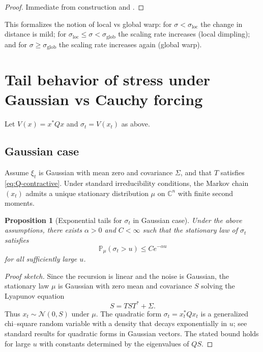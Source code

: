\documentclass[11pt]{article}
\theoremstyle{plain}
\newtheorem{proposition}[theorem]{Proposition}
\theoremstyle{definition}
\numberwithin{equation}{section}
\begin{document}
\begin{proof}
Immediate from construction and .
\end{proof}

This formalizes the notion of local vs global warp: for
$\sigma < \sigma_{\mathrm{loc}}$ the change in distance is mild;
for $\sigma_{\mathrm{loc}} \le \sigma < \sigma_{\mathrm{glob}}$ the
scaling rate increases (local dimpling); and for
$\sigma \ge \sigma_{\mathrm{glob}}$ the scaling rate increases again
(global warp).

\section{Tail behavior of stress under Gaussian vs Cauchy forcing}

Let $V(x) = x^\ast Q x$ and $\sigma_t = V(x_t)$ as above.

\subsection{Gaussian case}

Assume $\xi_t$ is Gaussian with mean zero and covariance $\Sigma$,
and that $T$ satisfies \eqref{eq:Q-contractive}. Under standard
irreducibility conditions, the Markov chain $(x_t)$ admits a unique
stationary distribution $\mu$ on $\mathbb{C}^n$ with finite second
moments.

\begin{proposition}[Exponential tails for $\sigma_t$ in Gaussian case]
\label{prop:gaussian-tails}
Under the above assumptions, there exists $\alpha>0$ and $C<\infty$
such that the stationary law of $\sigma_t$ satisfies
\begin{equation}
  \mathbb{P}_\mu(\sigma_t > u) \le C e^{-\alpha u}
\end{equation}
for all sufficiently large $u$.
\end{proposition}

\begin{proof}[Proof sketch]
Since the recursion is linear and the noise is Gaussian, the stationary
law $\mu$ is Gaussian with zero mean and covariance $S$ solving the
Lyapunov equation
\[
S = T S T^\ast + \Sigma.
\]
Thus $x_t \sim \mathcal{N}(0,S)$ under $\mu$. The quadratic form
$\sigma_t = x_t^\ast Q x_t$ is a generalized chi--square random
variable with a density that decays exponentially in $u$; see standard
results for quadratic forms in Gaussian vectors. The stated bound holds
for large $u$ with constants determined by the eigenvalues of $QS$.
\end{proof}
\end{document}
